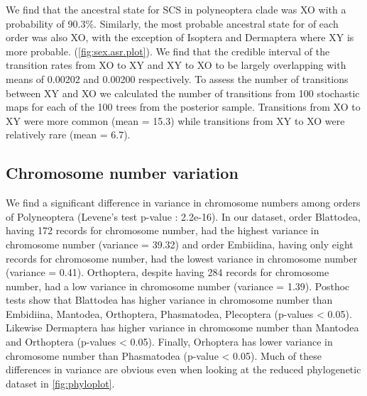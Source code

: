 We find that the ancestral state for SCS in polyneoptera clade was XO with a probability of 90.3\%.
Similarly, the most probable ancestral state for of each order was also XO, with the exception of Isoptera and Dermaptera where XY is more probable.
(\cref{fig:sex.asr.plot}).
We find that the credible interval of the transition rates from XO to XY and XY to XO to be largely overlapping with means of 0.00202 and 0.00200 respectively. 
To assess the number of transitions between XY and XO we calculated the number of transitions from 100 stochastic maps for each of the 100 trees from the posterior sample.
Transitions from XO to XY were more common (mean = 15.3) while transitions from XY to XO were relatively rare (mean = 6.7).

\subsection{Chromosome number variation}
We find a significant difference in variance in chromosome numbers among orders of Polyneoptera (Levene's test p-value : 2.2e-16). 
In our dataset, order Blattodea, having 172 records for chromosome number, had the highest variance in chromosome number (variance = 39.32) and order Embiidina, having only eight records for chromosome number, had the lowest variance in chromosome number (variance = 0.41).
Orthoptera, despite having 284 records for chromosome number, had a low variance in chromosome number (variance = 1.39). 
Posthoc tests show that Blattodea has higher variance in chromosome number than Embidiina, Mantodea, Orthoptera, Phasmatodea, Plecoptera (p-values < 0.05). 
Likewise Dermaptera has higher variance in chromosome number than Mantodea and Orthoptera (p-values < 0.05). 
Finally, Orhoptera has lower variance in chromosome number than Phasmatodea (p-value < 0.05).
Much of these differences in variance are obvious even when looking at the reduced phylogenetic dataset in \cref{fig:phyloplot}.

